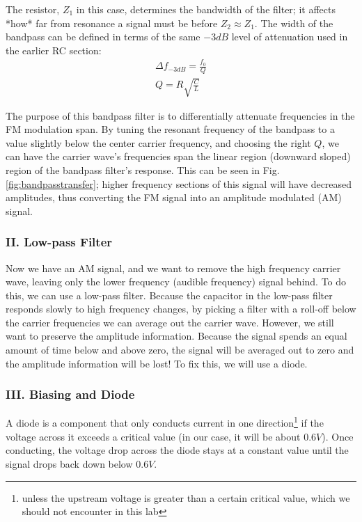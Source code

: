 \documentclass[12pt]{article}
\begin{document}
The resistor, $Z_1$ in this case, determines the bandwidth of the filter; it affects *how* far from resonance a signal must be before $Z_2 \approx Z_1$. The width of the bandpass can be defined in terms of the same $-3dB$ level of attenuation used in the earlier RC section:
\begin{eqnarray}
\Delta{f}_{-3dB} = \frac{f_0}{Q}\label{eq:bandwidth}\\
Q = R\sqrt{\frac{C}{L}}\nonumber
\end{eqnarray}

The purpose of this bandpass filter is to differentially attenuate frequencies in the FM modulation span. By tuning the resonant frequency of the bandpass to a value slightly below the center carrier frequency, and choosing the right $Q$, we can have the carrier wave's frequencies span the linear region (downward sloped) region of the bandpass filter's response. This can be seen in Fig.\ref{fig:bandpasstransfer}; higher frequency sections of this signal will have decreased amplitudes, thus converting the FM signal into an amplitude modulated (AM) signal.

\subsubsection*{II. Low-pass Filter}
Now we have an AM signal, and we want to remove the high frequency carrier wave, leaving only the lower frequency (audible frequency) signal behind. To do this, we can use a low-pass filter. Because the capacitor in the low-pass filter responds slowly to high frequency changes, by picking a filter with a roll-off below the carrier frequencies we can average out the carrier wave. However, we still want to preserve the amplitude information. Because the signal spends an equal amount of time below and above zero, the signal will be averaged out to zero and the amplitude information will be lost! To fix this, we will use a diode.

\subsubsection*{III. Biasing and Diode}
A diode is a component that only conducts current in one direction\footnote{unless the upstream voltage is greater than a certain critical value, which we should not encounter in this lab} if the voltage across it exceeds a critical value (in our case, it will be about $0.6V$). Once conducting, the voltage drop across the diode stays at a constant value until the signal drops back down below $0.6V$.
\end{document}
